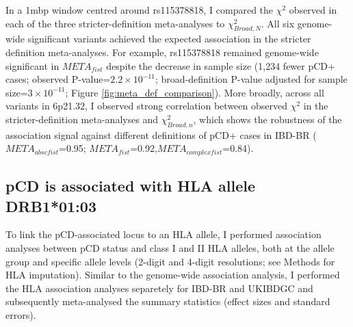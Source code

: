 In a 1mbp window centred around rs115378818, I compared the $\chi^{2}$ observed in each of the three stricter-definition meta-analyses to $\chi^{2}_{Broad,N}$. All six genome-wide significant variants achieved the expected association in the stricter definition meta-analyses. For example, rs115378818 remained genome-wide significant in $META_{fist}$ despite the decrease in sample size (1,234 fewer pCD+ cases; observed P-value=$2.2\times10^{-11}$; broad-definition P-value adjusted for sample size=$3\times10^{-11}$; Figure \ref{fig:meta_def_comparison}). More broadly, across all variants in 6p21.32, I observed strong correlation between observed $\chi^{2}$ in the stricter-definition meta-analyses and $\chi^{2}_{Broad,n}$, which shows the robustness of the association signal against different definitions of pCD+ cases in IBD-BR ($META_{abscfist}$=0.95; $META_{fist}$=0.92,$META_{complexfist}$=0.84). 


\subsection{pCD is associated with HLA allele DRB1*01:03}
To link the pCD-associated locus to an HLA allele, I performed association analyses between pCD status and class I and II HLA alleles, both at the allele group and specific allele levels (2-digit and 4-digit resolutions; see Methods for HLA imputation). Similar to the genome-wide association analysis, I performed the HLA association analyses separetely for IBD-BR and UKIBDGC and subsequently meta-analysed the summary statistics (effect sizes and standard errors). \\

